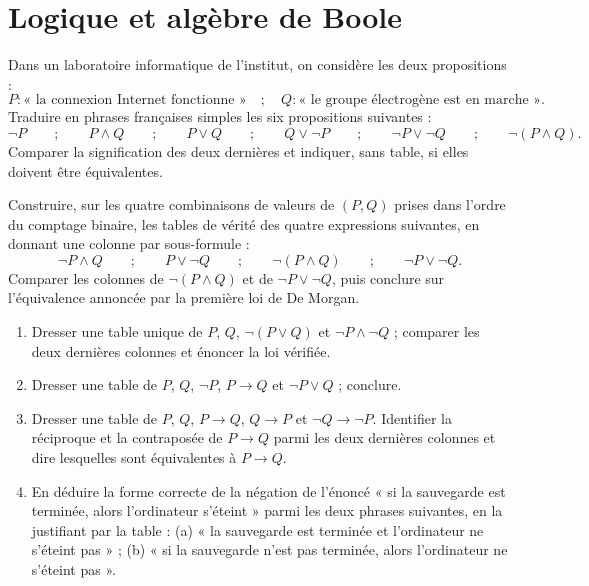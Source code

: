 \clearpage
\chapter{Logique et algèbre de Boole}

\begin{exercice}
Dans un laboratoire informatique de l'institut, on considère les deux propositions :
\[
P : \text{« la connexion Internet fonctionne »} \quad ; \quad Q : \text{« le groupe électrogène est en marche »}.
\]
Traduire en phrases françaises simples les six propositions suivantes :
\[
\lnot P \qquad ; \qquad P \land Q \qquad ; \qquad P \lor Q \qquad ; \qquad Q \lor \lnot P \qquad ; \qquad \lnot P \lor \lnot Q \qquad ; \qquad \lnot (P \land Q).
\]
Comparer la signification des deux dernières et indiquer, sans table, si elles doivent être équivalentes.
\end{exercice}

\begin{exercice}
Construire, sur les quatre combinaisons de valeurs de $(P, Q)$ prises dans l'ordre du comptage binaire, les tables de vérité des quatre expressions suivantes, en donnant une colonne par sous-formule :
\[
\lnot P \land Q \qquad ; \qquad P \lor \lnot Q \qquad ; \qquad \lnot (P \land Q) \qquad ; \qquad \lnot P \lor \lnot Q.
\]
Comparer les colonnes de $\lnot (P \land Q)$ et de $\lnot P \lor \lnot Q$, puis conclure sur l'équivalence annoncée par la première loi de De Morgan.
\end{exercice}

\begin{exercice}
\begin{enumerate}
\item Dresser une table unique de $P$, $Q$, $\lnot (P \lor Q)$ et $\lnot P \land \lnot Q$ ; comparer les deux dernières colonnes et énoncer la loi vérifiée.
\item Dresser une table de $P$, $Q$, $\lnot P$, $P \rightarrow Q$ et $\lnot P \lor Q$ ; conclure.
\item Dresser une table de $P$, $Q$, $P \rightarrow Q$, $Q \rightarrow P$ et $\lnot Q \rightarrow \lnot P$. Identifier la réciproque et la contraposée de $P \rightarrow Q$ parmi les deux dernières colonnes et dire lesquelles sont équivalentes à $P \rightarrow Q$.
\item En déduire la forme correcte de la négation de l'énoncé « si la sauvegarde est terminée, alors l'ordinateur s'éteint » parmi les deux phrases suivantes, en la justifiant par la table : (a) « la sauvegarde est terminée et l'ordinateur ne s'éteint pas » ; (b) « si la sauvegarde n'est pas terminée, alors l'ordinateur ne s'éteint pas ».
\end{enumerate}
\end{exercice}

